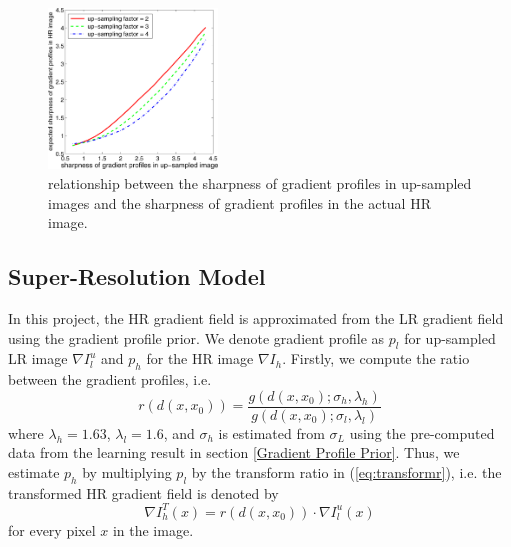 \documentclass[a4paper,11pt]{article}
\begin{document}
\begin{figure}[H]
	\centering
	\includegraphics[width=0.4\textwidth]{Expected-sharpness-of-the-gradient-profiles-in-HR-image-with-respect-to-sharpness-of-the.png}
	\caption{relationship between the sharpness of gradient profiles in up-sampled images and the sharpness of gradient profiles in the actual HR image.}
	\label{fig:es}
\end{figure}

\subsection{Super-Resolution Model}

In this project, the HR gradient field is approximated from the LR gradient field using the gradient profile prior. We denote gradient profile as $p_l$ for up-sampled LR image $\nabla I_l^u$ and $p_h$ for the HR image $\nabla I_h$. Firstly, we compute the ratio between the gradient profiles, i.e.
\begin{equation}
	\label{eq:transformr}
	r(d(x, x_0)) = \frac{g(d(x, x_0); \sigma_h, \lambda_h)}{g(d(x, x_0); \sigma_l, \lambda_l)}
\end{equation}
where $\lambda_h=1.63$, $\lambda_l=1.6$, and $\sigma_h$ is estimated from $\sigma_L$ using the pre-computed data from the learning result in section \ref{Gradient Profile Prior}. Thus, we estimate $p_h$ by multiplying $p_l$ by the transform ratio in (\ref{eq:transformr}), i.e. the transformed HR gradient field is denoted by
\begin{equation}
	\label{eq:transformgrad}
	\nabla I_h^T(x) = r(d(x, x_0)) \cdot \nabla I_l^u(x)
\end{equation}
for every pixel $x$ in the image.
\end{document}
